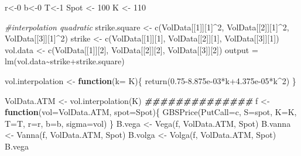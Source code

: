 \documentclass[
]{article}
\newenvironment{Shaded}{\begin{snugshade}}{\end{snugshade}}
\newcommand{\AttributeTok}[1]{\textcolor[rgb]{0.77,0.63,0.00}{#1}}
\newcommand{\CommentTok}[1]{\textcolor[rgb]{0.56,0.35,0.01}{\textit{#1}}}
\newcommand{\ControlFlowTok}[1]{\textcolor[rgb]{0.13,0.29,0.53}{\textbf{#1}}}
\newcommand{\DecValTok}[1]{\textcolor[rgb]{0.00,0.00,0.81}{#1}}
\newcommand{\DocumentationTok}[1]{\textcolor[rgb]{0.56,0.35,0.01}{\textbf{\textit{#1}}}}
\newcommand{\FloatTok}[1]{\textcolor[rgb]{0.00,0.00,0.81}{#1}}
\newcommand{\FunctionTok}[1]{\textcolor[rgb]{0.00,0.00,0.00}{#1}}
\newcommand{\NormalTok}[1]{#1}
\newcommand{\OtherTok}[1]{\textcolor[rgb]{0.56,0.35,0.01}{#1}}
\newcommand{\SpecialCharTok}[1]{\textcolor[rgb]{0.00,0.00,0.00}{#1}}
\newcommand{\StringTok}[1]{\textcolor[rgb]{0.31,0.60,0.02}{#1}}
\begin{document}
\begin{Shaded}
\begin{Highlighting}[]
\NormalTok{r}\OtherTok{\textless{}{-}}\DecValTok{0}
\NormalTok{b}\OtherTok{\textless{}{-}}\DecValTok{0}
\NormalTok{T}\OtherTok{\textless{}{-}}\DecValTok{1}
\NormalTok{Spot }\OtherTok{\textless{}{-}} \DecValTok{100}
\NormalTok{K }\OtherTok{\textless{}{-}} \DecValTok{110}

\CommentTok{\#interpolation quadratic}
\NormalTok{strike.square }\OtherTok{\textless{}{-}} \FunctionTok{c}\NormalTok{(VolData[[}\DecValTok{1}\NormalTok{]][}\DecValTok{1}\NormalTok{]}\SpecialCharTok{\^{}}\DecValTok{2}\NormalTok{, VolData[[}\DecValTok{2}\NormalTok{]][}\DecValTok{1}\NormalTok{]}\SpecialCharTok{\^{}}\DecValTok{2}\NormalTok{, VolData[[}\DecValTok{3}\NormalTok{]][}\DecValTok{1}\NormalTok{]}\SpecialCharTok{\^{}}\DecValTok{2}\NormalTok{)}
\NormalTok{strike }\OtherTok{\textless{}{-}} \FunctionTok{c}\NormalTok{(VolData[[}\DecValTok{1}\NormalTok{]][}\DecValTok{1}\NormalTok{], VolData[[}\DecValTok{2}\NormalTok{]][}\DecValTok{1}\NormalTok{], VolData[[}\DecValTok{3}\NormalTok{]][}\DecValTok{1}\NormalTok{])}
\NormalTok{vol.data }\OtherTok{\textless{}{-}} \FunctionTok{c}\NormalTok{(VolData[[}\DecValTok{1}\NormalTok{]][}\DecValTok{2}\NormalTok{], VolData[[}\DecValTok{2}\NormalTok{]][}\DecValTok{2}\NormalTok{], VolData[[}\DecValTok{3}\NormalTok{]][}\DecValTok{2}\NormalTok{])}
\NormalTok{output }\OtherTok{=}  \FunctionTok{lm}\NormalTok{(vol.data}\SpecialCharTok{\textasciitilde{}}\NormalTok{strike}\SpecialCharTok{+}\NormalTok{strike.square)}

\NormalTok{vol.interpolation }\OtherTok{\textless{}{-}} \ControlFlowTok{function}\NormalTok{(}\AttributeTok{k=}\NormalTok{ K)\{}
  \FunctionTok{return}\NormalTok{(}\FloatTok{0.75{-}8.875e{-}03}\SpecialCharTok{*}\NormalTok{k}\FloatTok{+4.375e{-}05}\SpecialCharTok{*}\NormalTok{k}\SpecialCharTok{\^{}}\DecValTok{2}\NormalTok{) }
\NormalTok{\}}

\NormalTok{VolData.ATM }\OtherTok{\textless{}{-}} \FunctionTok{vol.interpolation}\NormalTok{(K)}
\DocumentationTok{\#\#\#\#\#\#\#\#\#\#\#\#\#\#}
\NormalTok{f }\OtherTok{\textless{}{-}} \ControlFlowTok{function}\NormalTok{(}\AttributeTok{vol=}\NormalTok{VolData.ATM, }\AttributeTok{spot=}\NormalTok{Spot)\{}
  \FunctionTok{GBSPrice}\NormalTok{(}\AttributeTok{PutCall=}\StringTok{\textquotesingle{}c\textquotesingle{}}\NormalTok{, }\AttributeTok{S=}\NormalTok{spot, }\AttributeTok{K=}\NormalTok{K, }\AttributeTok{T=}\NormalTok{T, }\AttributeTok{r=}\NormalTok{r, }\AttributeTok{b=}\NormalTok{b, }\AttributeTok{sigma=}\NormalTok{vol)}
\NormalTok{\}}
\NormalTok{B.vega }\OtherTok{\textless{}{-}} \FunctionTok{Vega}\NormalTok{(f, VolData.ATM, Spot)}
\NormalTok{B.vanna }\OtherTok{\textless{}{-}} \FunctionTok{Vanna}\NormalTok{(f, VolData.ATM, Spot)}
\NormalTok{B.volga }\OtherTok{\textless{}{-}} \FunctionTok{Volga}\NormalTok{(f, VolData.ATM, Spot)}
\NormalTok{B.vega}
\end{Highlighting}
\end{Shaded}
\end{document}
